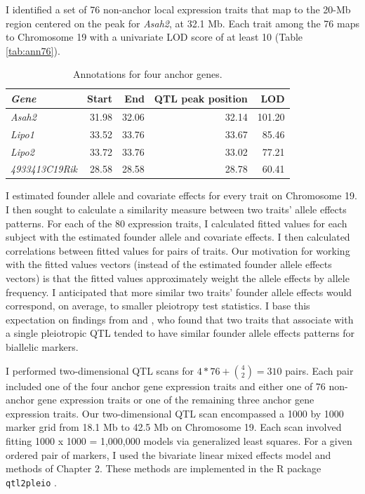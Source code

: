\documentclass[oneside]{book}\usepackage[]{graphicx}\usepackage[]{color}
\begin{document}
I identified a set of 76 non-anchor local expression traits that map to the 20-Mb region centered on the peak for \emph{Asah2}, at 32.1 Mb. Each trait among the 76 maps to Chromosome 19 with a univariate LOD score of at least 10 (Table \ref{tab:ann76}).


\begin{table}[ht]
\caption{Annotations for four anchor genes.}\label{tab:ann4}
\centering
\begin{tabular}{>{\em}lrrrr}
  \hline
Gene & Start & End & QTL peak position & LOD \\
  \hline
Asah2 & 31.98 & 32.06 & 32.14 & 101.20 \\
  Lipo1 & 33.52 & 33.76 & 33.67 & 85.46 \\
  Lipo2 & 33.72 & 33.76 & 33.02 & 77.21 \\
  4933413C19Rik & 28.58 & 28.58 & 28.78 & 60.41 \\
   \hline
\end{tabular}
\end{table}







I estimated founder allele and covariate effects for every trait on Chromosome 19. I then 
sought to calculate a similarity measure between two traits' allele effects patterns. 
For each of the 80 expression traits, I calculated fitted values for each subject with the 
estimated founder allele and covariate effects. 
I then calculated correlations between fitted values for pairs of traits. 
Our motivation for working with the fitted values vectors 
(instead of the estimated founder allele effects vectors) is that the fitted values 
approximately weight the allele effects by allele frequency. 
I anticipated that more similar two traits' founder allele effects would correspond, on 
average, to smaller pleiotropy test statistics. 
I base this expectation on findings from \citet{macdonald2007joint} and 
\citet{king2012genetic}, who found that two traits that associate with a single 
pleiotropic QTL tended to have similar founder allele effects patterns for biallelic 
markers. 


I performed two-dimensional QTL scans for $4 * 76 + \binom{4}{2} = 310$ pairs. 
Each pair included one of the four anchor gene expression traits and 
either one of 76 non-anchor gene expression traits or one of 
the remaining three anchor gene expression traits.
Our two-dimensional QTL scan encompassed a 1000 by 1000 marker grid from 18.1 Mb to 42.5 Mb 
on Chromosome 19. 
Each scan involved fitting 1000 x 1000 = 1,000,000 models via generalized least squares. 
For a given ordered pair of markers, I used the bivariate linear mixed effects model and 
methods of Chapter 2. 
These methods are implemented in the R package \texttt{qtl2pleio} \citep{qtl2pleio}.
\end{document}
